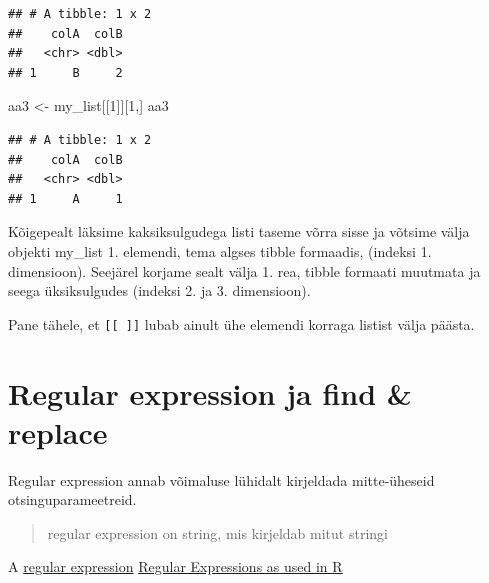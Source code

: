 \documentclass[]{book}
\newenvironment{Shaded}{\begin{snugshade}}{\end{snugshade}}
\newcommand{\DecValTok}[1]{\textcolor[rgb]{0.00,0.00,0.81}{#1}}
\newcommand{\StringTok}[1]{\textcolor[rgb]{0.31,0.60,0.02}{#1}}
\newcommand{\CommentTok}[1]{\textcolor[rgb]{0.56,0.35,0.01}{\textit{#1}}}
\newcommand{\OperatorTok}[1]{\textcolor[rgb]{0.81,0.36,0.00}{\textbf{#1}}}
\newcommand{\NormalTok}[1]{#1}
\begin{document}
\begin{Shaded}
\end{Shaded}

\begin{verbatim}
## # A tibble: 1 x 2
##    colA  colB
##   <chr> <dbl>
## 1     B     2
\end{verbatim}

\begin{Shaded}
\begin{Highlighting}[]
\NormalTok{aa3 <-}\StringTok{ }\NormalTok{my_list[[}\DecValTok{1}\NormalTok{]][}\DecValTok{1}\NormalTok{,]}
\NormalTok{aa3}
\end{Highlighting}
\end{Shaded}

\begin{verbatim}
## # A tibble: 1 x 2
##    colA  colB
##   <chr> <dbl>
## 1     A     1
\end{verbatim}

Kõigepealt läksime kaksiksulgudega listi taseme võrra sisse ja võtsime
välja objekti my\_list 1. elemendi, tema algses tibble formaadis,
(indeksi 1. dimensioon). Seejärel korjame sealt välja 1. rea, tibble
formaati muutmata ja seega üksiksulgudes (indeksi 2. ja 3. dimensioon).

Pane tähele, et \texttt{{[}{[}\ {]}{]}} lubab ainult ühe elemendi
korraga listist välja päästa.

\section{Regular expression ja find \&
replace}\label{regular-expression-ja-find-replace}

Regular expression annab võimaluse lühidalt kirjeldada mitte-üheseid
otsinguparameetreid.

\begin{quote}
regular expression on string, mis kirjeldab mitut stringi
\end{quote}

A
\href{https://stat.ethz.ch/R-manual/R-devel/library/base/html/regex.html}{regular
expression}
\href{https://stat.ethz.ch/R-manual/R-devel/library/base/html/regex.html}{Regular
Expressions as used in R}
\end{document}
